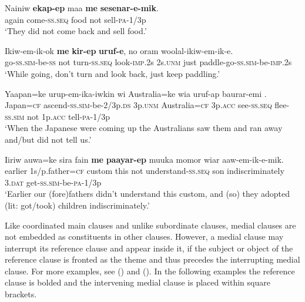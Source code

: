 \ea%
\label{ex:x1443}
\gll Nainiw  \textbf{ekap-ep}  maa  \textbf{me} \textbf{sesenar-e-mik}. \\
again  come-\textsc{ss}.\textsc{seq} food  not  sell-\textsc{pa}-1/3p\\
\glt`They did not come back and sell food.'
\z


\ea%
\label{ex:x1447}
\gll Ikiw-em-ik-ok  \textbf{me} \textbf{kir-ep} \textbf{uruf-e}, no  oram  woolal-ikiw-em-ik-e.\\
go-\textsc{ss}.\textsc{sim}-be-\textsc{ss} not  turn-\textsc{ss}.\textsc{seq} look-\textsc{imp}.2s 2s.\textsc{unm} just  paddle-go-\textsc{ss}.\textsc{sim}-be-\textsc{imp}.2s\\
\glt`While going, don't turn and look back, just keep paddling.'
\z


\ea%
\label{ex:x1446}
\gll Yaapan=ke  urup-em-ika-iwkin  wi  Australia=ke wia  uruf-ap  baurar-emi     .\\
Japan=\textsc{cf} ascend-\textsc{ss}.\textsc{sim}-be-2/3p.\textsc{ds} 3p.\textsc{unm} Australia=\textsc{cf} 3p.\textsc{acc} see-\textsc{ss}.\textsc{seq} flee-\textsc{ss}.\textsc{sim} not 1p.\textsc{acc} tell-\textsc{pa}-1/3p\\
\glt`When the Japanese were coming up the Australians saw them and ran away and/but did not tell us.'
\z


\ea%
\label{ex:x1448}
\gll Iiriw  auwa=ke  sira  fain  \textbf{me}  \textbf{paayar-ep} muuka  momor  wiar  aaw-em-ik-e-mik.\\
earlier  1s/p.father=\textsc{cf} custom  this  not  understand-\textsc{ss}.\textsc{seq} son indiscriminately 3.\textsc{dat} get-\textsc{ss}.\textsc{sim}-be-\textsc{pa}-1/3p\\
\glt`Earlier our (fore)fathers didn't understand this custom, and (so) they adopted (lit: got/took) children indiscriminately.'
\z


Like coordinated main clauses and unlike subordinate clauses, medial clauses are not embedded as constituents in other clauses. However, a medial clause may interrupt its reference clause and appear inside it, if the subject or object  of the reference clause is fronted as the theme and thus precedes the interrupting medial clause. For more examples, see () and (). In the following examples the reference clause is bolded and the intervening medial clause is placed within square brackets.

